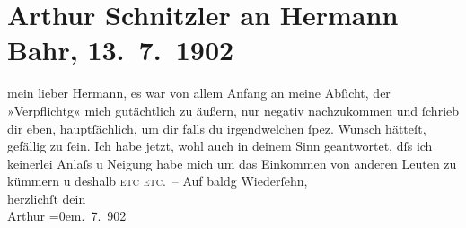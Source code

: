 

         
         \renewcommand{\erwaehntePersonen}{Personen: Hermann Bahr}
         \renewcommand{\erwaehnteOrte}{Orte: Wien}
         \renewcommand{\erwaehnteWerke}{}
               \section[Arthur Schnitzler an Hermann Bahr, 13. 7. 1902]{ Arthur Schnitzler an Hermann Bahr, 13. 7. 1902}\nopagebreak{}\rehead{ }\begin{ledgroupsized}[t]{13cm}\normalsize\beginnumbering \toendnotes[C]{\smallbreak\pagebreak[2]} 
\pstart{}{\pb}mein lieber
                  Hermann,\pend\pstart
           es war von allem Anfang an meine Abſicht, der »Verpflichtg« mich gutächtlich zu
               äußern, nur negativ nachzukommen und ſchrieb dir eben, hauptſächlich, um dir falls du
               irgendwelchen ſpez. Wunsch hätteſt, gefällig zu ſein. Ich habe jetzt, wohl auch in
               deinem Sinn geantwortet, dſs ich keinerlei Anlaſs u Neigung habe mich um das
               Einkommen {\pb}von anderen
               Leuten zu kümmern u deshalb \textsc{etc etc.} –\pend
           \pstart
           Auf baldg Wiederſehn,{\\[\baselineskip]}herzlichſt dein{\\[\baselineskip]}\spacefill\mbox{Arthur}\pend
           \leftskip=0em{}. 7. 902\pend
           
         
         \endnumbering{}\end{ledgroupsized}  \newcommand{\dateiname}{L01231}\newcommand{\titel}{Arthur Schnitzler an Hermann Bahr, 13. 7. 1902}\newcommand{\editorInnen}{ Kurt Ifkovits,  Martin Anton Müller}
      